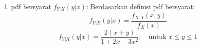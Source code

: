 \documentclass[12pt,a4paper]{article}
\begin{document}
\begin{enumerate}
\begin{enumerate}[label=(\alph*)]
          \item pdf bersyarat $f_{Y|X}(y|x)$:
                Berdasarkan definisi pdf bersyarat:
                \[ f_{Y|X}(y|x) = \frac{f_{X,Y}(x,y)}{f_X(x)} \]
                \[ f_{Y|X}(y|x) = \frac{2(x+y)}{1 + 2x - 3x^2}, \quad \text{untuk } x \le y \le 1 \]
        \end{enumerate}
\end{enumerate}
\end{document}
